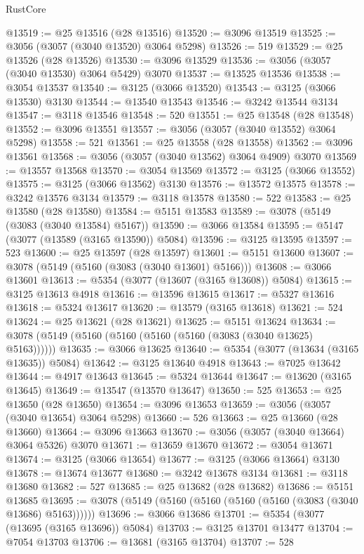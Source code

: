 \begin{lexlean}{RustCore}
\begin{coremodule}
@13519 := @25 @13516 (@28 @13516)
@13520 := @3096 @13519
@13525 := @3056 (@3057 (@3040 @13520) @3064 @5298)
@13526 := 519
@13529 := @25 @13526 (@28 @13526)
@13530 := @3096 @13529
@13536 := @3056 (@3057 (@3040 @13530) @3064 @5429) @3070
@13537 := @13525 @13536
@13538 := @3054 @13537
@13540 := @3125 (@3066 @13520)
@13543 := @3125 (@3066 @13530) @3130
@13544 := @13540 @13543
@13546 := @3242 @13544 @3134
@13547 := @3118 @13546
@13548 := 520
@13551 := @25 @13548 (@28 @13548)
@13552 := @3096 @13551
@13557 := @3056 (@3057 (@3040 @13552) @3064 @5298)
@13558 := 521
@13561 := @25 @13558 (@28 @13558)
@13562 := @3096 @13561
@13568 := @3056 (@3057 (@3040 @13562) @3064 @4909) @3070
@13569 := @13557 @13568
@13570 := @3054 @13569
@13572 := @3125 (@3066 @13552)
@13575 := @3125 (@3066 @13562) @3130
@13576 := @13572 @13575
@13578 := @3242 @13576 @3134
@13579 := @3118 @13578
@13580 := 522
@13583 := @25 @13580 (@28 @13580)
@13584 := @5151 @13583
@13589 := @3078 (@5149 (@3083 (@3040 @13584) @5167))
@13590 := @3066 @13584
@13595 := @5147 (@3077 (@13589 (@3165 @13590)) @5084)
@13596 := @3125 @13595
@13597 := 523
@13600 := @25 @13597 (@28 @13597)
@13601 := @5151 @13600
@13607 := @3078 (@5149 (@5160 (@3083 (@3040 @13601) @5166)))
@13608 := @3066 @13601
@13613 := @5354 (@3077 (@13607 (@3165 @13608)) @5084)
@13615 := @3125 @13613 @4918
@13616 := @13596 @13615
@13617 := @5327 @13616
@13618 := @5324 @13617
@13620 := @13579 (@3165 @13618)
@13621 := 524
@13624 := @25 @13621 (@28 @13621)
@13625 := @5151 @13624
@13634 := @3078 (@5149 (@5160 (@5160 (@5160 (@5160 (@3083 (@3040 @13625) @5163))))))
@13635 := @3066 @13625
@13640 := @5354 (@3077 (@13634 (@3165 @13635)) @5084)
@13642 := @3125 @13640 @4918
@13643 := @7025 @13642
@13644 := @4917 @13643
@13645 := @5324 @13644
@13647 := @13620 (@3165 @13645)
@13649 := @13547 (@13570 @13647)
@13650 := 525
@13653 := @25 @13650 (@28 @13650)
@13654 := @3096 @13653
@13659 := @3056 (@3057 (@3040 @13654) @3064 @5298)
@13660 := 526
@13663 := @25 @13660 (@28 @13660)
@13664 := @3096 @13663
@13670 := @3056 (@3057 (@3040 @13664) @3064 @5326) @3070
@13671 := @13659 @13670
@13672 := @3054 @13671
@13674 := @3125 (@3066 @13654)
@13677 := @3125 (@3066 @13664) @3130
@13678 := @13674 @13677
@13680 := @3242 @13678 @3134
@13681 := @3118 @13680
@13682 := 527
@13685 := @25 @13682 (@28 @13682)
@13686 := @5151 @13685
@13695 := @3078 (@5149 (@5160 (@5160 (@5160 (@5160 (@3083 (@3040 @13686) @5163))))))
@13696 := @3066 @13686
@13701 := @5354 (@3077 (@13695 (@3165 @13696)) @5084)
@13703 := @3125 @13701 @13477
@13704 := @7054 @13703
@13706 := @13681 (@3165 @13704)
@13707 := 528

\end{coremodule}
\end{lexlean}
